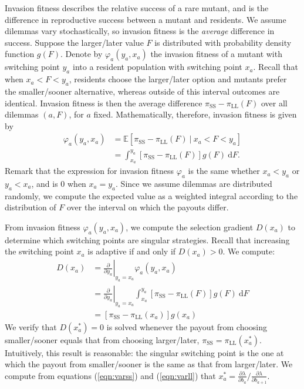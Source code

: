 \documentclass[titlepage, hidelinks, 12pt]{article}
\theoremstyle{plain}
\theoremstyle{remark}
\theoremstyle{definition}
\newcommand{\varSS}{\frac{\partial \lambda}{ \partial b_{a}}}
\newcommand{\varLL}{\frac{\partial \lambda}{ \partial b_{a+1}}}
\DeclareMathOperator{\smallersooner}{SS}
\DeclareMathOperator{\largerlater}{LL}
\renewcommand\d[1]{\:\textrm{d}#1}
\begin{document}
Invasion fitness describes the relative success of a rare mutant, and is the difference in reproductive success between
a mutant and residents.  We assume dilemmas
vary stochastically, so invasion fitness is the \textit{average} difference in success. Suppose the larger/later value $F$ is distributed with probability
density function $g(F)$. 
Denote by $\varphi_a(y_a, x_a)$ the invasion fitness of a mutant with switching point
$y_a$ into a resident population with switching point $x_a$.  
Recall that when $x_a < F < y_a$, residents choose the larger/later option and mutants prefer the smaller/sooner alternative, whereas
outside of this interval outcomes are identical. Invasion fitness is then the average difference $\pi_{\smallersooner} - \pi_{\largerlater}(F)$
over all dilemmas $(a, F)$, for $a$ fixed. 
Mathematically, therefore, invasion fitness is given by 
\begin{align}
    \varphi_a(y_a, x_a) &= \mathbb{E}\left[ \pi_{\smallersooner} - \pi_{\largerlater}(F) \ | \ x_a < F < y_a\right] \\
    &= \int_{x_a}^{y_a} \left[ \pi_{\smallersooner} - \pi_{\largerlater}(F) \right]g(F) \d F. 
\end{align}
Remark that the expression for invasion fitness
$\varphi_a$ is the same whether $x_a < y_a$ or $y_a < x_a$, and is $0$ when $x_a = y_a$. 
Since we assume dilemmas are distributed randomly, we compute the expected value as a weighted integral according to the distribution of $F$ over
the interval on which the payouts differ. 

From invasion fitness $\varphi_a(y_a, x_a)$, we compute the selection gradient $D(x_a)$ to determine which switching points
are singular strategies.  
Recall that increasing the switching point $x_a$ is adaptive if and only if $D(x_a) > 0$. We compute: 
\begin{align}
    D(x_a) &= \left.\frac{\partial }{\partial y_a} \right\vert_{y_a = x_a}\varphi_a(y_a, x_a)  \\
    &=\left.\frac{\partial }{\partial y_a} \right\vert_{y_a = x_a}  \int_{x_a}^{y_a} \left[ \pi_{\smallersooner} - \pi_{\largerlater}(F) \right]g(F) \d F\\
        &=\left[ \pi_{\smallersooner} - \pi_{\largerlater}(x_a)   \right]g(x_a) 
\end{align}
We verify that $D(x_a^*) = 0$ is solved whenever the payout from choosing smaller/sooner equals that from choosing larger/later,
$\pi_{\smallersooner} = \pi_{\largerlater}(x_a^*)$. Intuitively, this result is reasonable: the singular switching point 
is the one at which the payout from smaller/sooner is the same as that from larger/later. 
We compute from equations (\ref{eqn:varss}) and (\ref{eqn:varll}) that
$x_a^* =  \varSS/\varLL$. 
\end{document}
